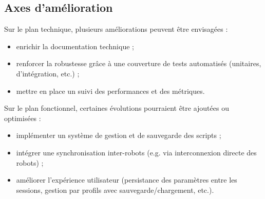 \subsection{Axes d'amélioration} \label{sec:axes_amelioration}

Sur le plan technique, plusieurs améliorations peuvent être envisagées :
\begin{itemize}
    \item enrichir la documentation technique ;
    \item renforcer la robustesse grâce à une couverture de tests automatisés (unitaires, d’intégration, etc.) ;
    \item mettre en place un suivi des performances et des métriques.
\end{itemize}

Sur le plan fonctionnel, certaines évolutions pourraient être ajoutées ou optimisées :
\begin{itemize}
    \item implémenter un système de gestion et de sauvegarde des scripts ;
    \item intégrer une synchronisation inter-robots (e.g. via interconnexion directe des robots) ;
    \item améliorer l’expérience utilisateur (persistance des paramètres entre les sessions, gestion par profils avec sauvegarde/chargement, etc.).
\end{itemize}
